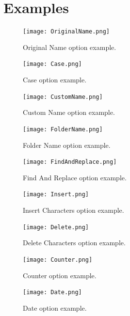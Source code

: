 \documentclass[11pt, a4paper]{scrartcl}
\begin{document}
\section{Examples}

\begin{figure}[!ht]
        \centering
        \texttt{[image: OriginalName.png]}
        \caption{Original Name option example.}
        \label{OriginalName}
\end{figure}
\begin{figure}[!ht]
        \centering
        \texttt{[image: Case.png]}
        \caption{Case option example.}
        \label{Case}
\end{figure}
\begin{figure}[!ht]
        \centering
        \texttt{[image: CustomName.png]}
        \caption{Custom Name option example.}
        \label{CustomName}
\end{figure}
\begin{figure}[!ht]
        \centering
        \texttt{[image: FolderName.png]}
        \caption{Folder Name option example.}
        \label{FolderName}
\end{figure}
\begin{figure}[!ht]
        \centering
        \texttt{[image: FindAndReplace.png]}
        \caption{Find And Replace option example.}
        \label{FindAndReplace}
\end{figure}
\begin{figure}[!ht]
        \centering
        \texttt{[image: Insert.png]}
        \caption{Insert Characters option example.}
        \label{Insert}
\end{figure}
\begin{figure}[!ht]
        \centering
        \texttt{[image: Delete.png]}
        \caption{Delete Characters option example.}
        \label{Delete}
\end{figure}
\begin{figure}[!ht]
        \centering
        \texttt{[image: Counter.png]}
        \caption{Counter option example.}
        \label{Counter}
\end{figure}
\begin{figure}[!ht]
        \centering
        \texttt{[image: Date.png]}
        \caption{Date option example.}
        \label{Date}
\end{figure}
\end{document}
